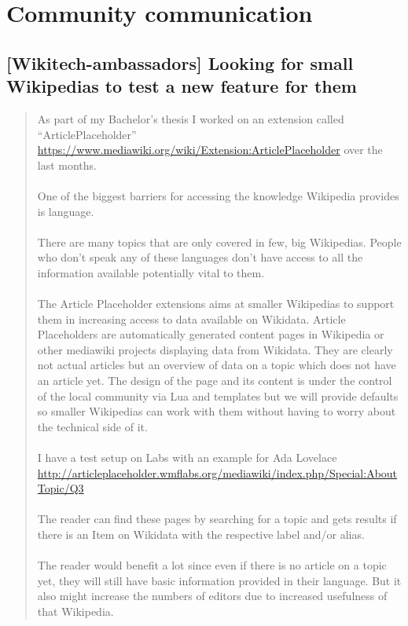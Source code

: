 \section{Community communication}

\subsection{[Wikitech-ambassadors] Looking for small Wikipedias to test a new feature for them}
\begin{quote}
As part of my Bachelor’s thesis I worked on an extension called “ArticlePlaceholder” \url{https://www.mediawiki.org/wiki/Extension:ArticlePlaceholder} over the last months. \\
\\
One of the biggest barriers for accessing the knowledge Wikipedia provides is language. \\
\\
There are many topics that are only covered in few, big Wikipedias. People who don’t speak any of these languages don’t have access to all the information available potentially vital to them. \\
\\
The Article Placeholder extensions aims at smaller Wikipedias to support them in increasing access to data available on Wikidata. Article Placeholders are automatically generated content pages in Wikipedia or other mediawiki projects displaying data from Wikidata. They are clearly not actual articles but an overview of data on a topic which does not have an article yet. The design of the page and its content is under the control of the local community via Lua and templates but we will provide defaults so smaller Wikipedias can work with them without having to worry about the technical side of it. \\
\\
I have a test setup on Labs with an example for Ada Lovelace \url{http://articleplaceholder.wmflabs.org/mediawiki/index.php/Special:AboutTopic/Q3} \\
\\
The reader can find these pages by searching for a topic and gets results if there is an Item on Wikidata with the respective label and/or alias. \\
\\
The reader would benefit a lot since even if there is no article on a topic yet, they will still have basic information provided in their language. But it also might increase the numbers of editors due to increased usefulness of that Wikipedia. \\

\end{quote}
